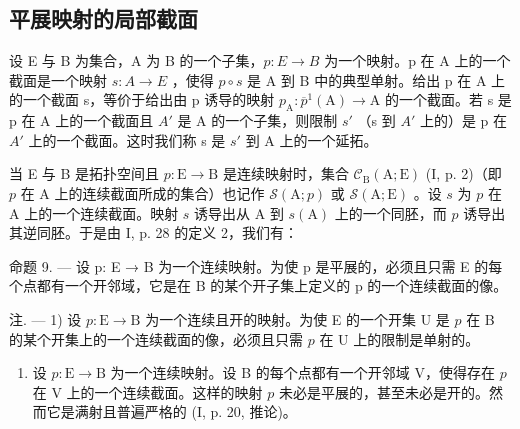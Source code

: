 \subsection{平展映射的局部截面}

设 E 与 B 为集合，A 为 B 的一个子集，\(p: E \rightarrow B\) 为一个映射。p 在 A 上的一个截面是一个映射 \(s: A \rightarrow E\) ，使得 \(p \circ s\) 是 A 到 B 中的典型单射。给出 p 在 A 上的一个截面 s，等价于给出由 p 诱导的映射 \(p_{\mathrm{A}} \colon \overline{p}^{1}(\mathrm{A}) \to \mathrm{A}\) 的一个截面。若 s 是 p 在 A 上的一个截面且 \(A'\) 是 A 的一个子集，则限制 \(s'\) （s 到 \(A'\) 上的）是 p 在 \(A'\) 上的一个截面。这时我们称 s 是 \(s'\) 到 A 上的一个延拓。

当 E 与 B 是拓扑空间且 \(p \colon \mathrm{E} \to \mathrm{B}\) 是连续映射时，集合 \(\mathcal{C}_{\mathrm{B}}(\mathrm{A};\mathrm{E})\) (I, p. 2)（即 \(p\) 在 A 上的连续截面所成的集合）也记作 \(\mathcal{S}(\mathrm{A};p)\) 或 \(\mathcal{S}(\mathrm{A};\mathrm{E})\) 。设 \(s\) 为 \(p\) 在 A 上的一个连续截面。映射 \(s\) 诱导出从 A 到 \(s(\mathrm{A})\) 上的一个同胚，而 \(p\) 诱导出其逆同胚。于是由 I, p. 28 的定义 2，我们有：

命题 9. --- 设 p: E → B 为一个连续映射。为使 p 是平展的，必须且只需 E 的每个点都有一个开邻域，它是在 B 的某个开子集上定义的 p 的一个连续截面的像。

注. --- 1) 设 \(p \colon \mathrm{E} \to \mathrm{B}\) 为一个连续且开的映射。为使 E 的一个开集 U 是 \(p\) 在 B 的某个开集上的一个连续截面的像，必须且只需 \(p\) 在 U 上的限制是单射的。

\begin{enumerate}
\def\labelenumi{\arabic{enumi})}
\setcounter{enumi}{1}
\tightlist
\item
  设 \(p \colon \mathrm{E} \to \mathrm{B}\) 为一个连续映射。设 B 的每个点都有一个开邻域 V，使得存在 \(p\) 在 V 上的一个连续截面。这样的映射 \(p\) 未必是平展的，甚至未必是开的。然而它是满射且普遍严格的 (I, p. 20, 推论)。
\end{enumerate}

